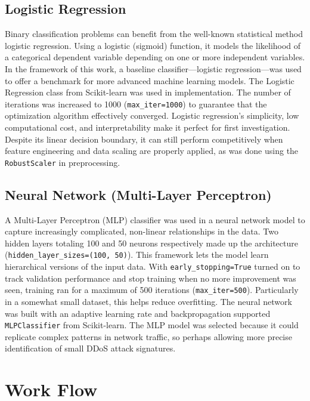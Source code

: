 \documentclass[conference]{IEEEtran}
\begin{document}
\subsection{Logistic Regression}
Binary classification problems can benefit from the well-known statistical method logistic regression. Using a logistic (sigmoid) function, it models the likelihood of a categorical dependent variable depending on one or more independent variables. In the framework of this work, a baseline classifier—logistic regression—was used to offer a benchmark for more advanced machine learning models. The Logistic Regression class from Scikit-learn was used in implementation. The number of iterations was increased to 1000 (\texttt{max\_iter=1000}) to guarantee that the optimization algorithm effectively converged. Logistic regression's simplicity, low computational cost, and interpretability make it perfect for first investigation. Despite its linear decision boundary, it can still perform competitively when feature engineering and data scaling are properly applied, as was done using the \texttt{RobustScaler} in preprocessing.

\subsection{Neural Network (Multi-Layer Perceptron)}
A Multi-Layer Perceptron (MLP) classifier was used in a neural network model to capture increasingly complicated, non-linear relationships in the data. Two hidden layers totaling 100 and 50 neurons respectively made up the architecture (\texttt{hidden\_layer\_sizes=(100, 50)}). This framework lets the model learn hierarchical versions of the input data. With \texttt{early\_stopping=True} turned on to track validation performance and stop training when no more improvement was seen, training ran for a maximum of 500 iterations (\texttt{max\_iter=500}). Particularly in a somewhat small dataset, this helps reduce overfitting. The neural network was built with an adaptive learning rate and backpropagation supported \texttt{MLPClassifier} from Scikit-learn. The MLP model was selected because it could replicate complex patterns in network traffic, so perhaps allowing more precise identification of small DDoS attack signatures.



\section{Work Flow}
\end{document}
